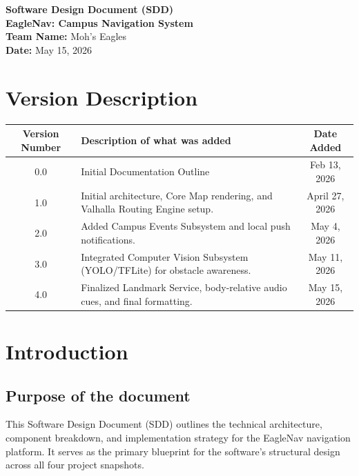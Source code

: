 \documentclass[12pt]{article}
\begin{document}
\begin{titlepage}
    \centering
    \vspace*{2in}
    {\Huge \textbf{Software Design Document (SDD)}}\\[1cm]
    {\Large \textbf{EagleNav: Campus Navigation System}}\\[2cm]
    {\large \textbf{Team Name:} Moh's Eagles}\\[0.5cm]
    {\large \textbf{Date:} May 15, 2026}\\[2cm]
    \vfill
\end{titlepage}

\tableofcontents
\newpage

\section*{Version Description}
\begin{table}[h]
    \centering
    \begin{tabularx}{\textwidth}{|c|X|c|}
        \hline
        \textbf{Version Number} & \textbf{Description of what was added} & \textbf{Date Added} \\ \hline
        0.0 & Initial Documentation Outline & Feb 13, 2026\\ \hline
        1.0 & Initial architecture, Core Map rendering, and Valhalla Routing Engine setup. & April 27, 2026 \\ \hline
        2.0 & Added Campus Events Subsystem and local push notifications. & May 4, 2026 \\ \hline
        3.0 & Integrated Computer Vision Subsystem (YOLO/TFLite) for obstacle awareness. & May 11, 2026 \\ \hline
        4.0 & Finalized Landmark Service, body-relative audio cues, and final formatting. & May 15, 2026 \\ \hline
    \end{tabularx}
\end{table}

\newpage


\section{Introduction}

\subsection{Purpose of the document}
This Software Design Document (SDD) outlines the technical architecture, component breakdown, and implementation strategy for the EagleNav navigation platform. It serves as the primary blueprint for the software's structural design across all four project snapshots.
\end{document}
